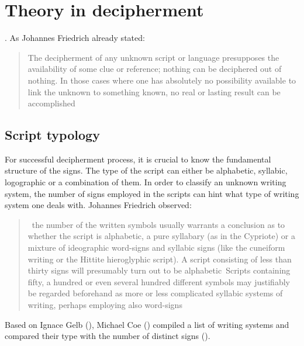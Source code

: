 \documentclass[../main.tex]{subfiles}
\begin{document}
\section{Theory in decipherment}
.
As Johannes Friedrich already stated:
\blockquote[{\cite[152]{friedrich1957}}]{The decipherment of any unknown script or language 
presupposes the availability of some clue or reference; nothing can be deciphered out of nothing. 
In those cases where one has absolutely no possibility available to link the unknown to 
something known, \elide no real or lasting result can be accomplished}

\subsection{Script typology}
For successful decipherment process, it is crucial to know the fundamental structure of the signs.
The type of the script can either be alphabetic, syllabic, logographic or a combination of them.
In order to classify an unknown writing system, the number of signs employed in the scripts
can hint what type of writing system one deals with.
Johannes Friedrich observed:
\blockquote[{\cite[152]{friedrich1957}}]{\elide~the number of the written symbols usually warrants a 
conclusion as to whether the script is alphabetic, a pure syllabary (as in the Cypriote) or a
mixture of ideographic word-signs and syllabic signs (like the cuneiform writing or the Hittite
hieroglyphic script). A script consisting of less than thirty signs will presumably turn out to
be alphabetic\elide~Scripts containing fifty, a hundred or even several hundred different symbols
may justifiably be regarded beforehand as more or less complicated syllabic systems of writing,
perhaps employing also word-signs\elide}.
Based on Ignace Gelb (\cite[115]{gelb1963}), Michael Coe (\cite[43]{coe1992}) compiled a list
of writing systems and compared their type with the number of distinct signs
().
\end{document}
